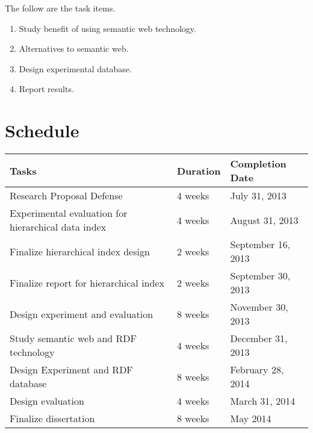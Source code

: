 The follow are the task items.

\begin{enumerate}
\item Study benefit of using semantic web technology.
\item Alternatives to semantic web.
\item Design experimental database.
\item Report results.
\end{enumerate}

\section{Schedule}

\begin{table}[ht]
\centering
\begin{tabular}{|l|l|l|}
\hline
{\bf Tasks} & {\bf Duration} & {\bf Completion Date} \\ \hline\hline
Research Proposal Defense & 4 weeks & July 31, 2013 \\
Experimental evaluation for hierarchical data index & 4 weeks & August 31, 2013 \\
Finalize hierarchical index design & 2 weeks & September 16, 2013\\
Finalize report for hierarchical index & 2 weeks & September 30, 2013\\
Design experiment and evaluation & 8 weeks & November 30, 2013 \\
Study semantic web and RDF technology & 4 weeks & December 31, 2013\\
Design Experiment and RDF database & 8 weeks & February 28, 2014\\
Design evaluation & 4 weeks & March 31, 2014\\
Finalize dissertation & 8 weeks & May 2014\\
\hline
\end{tabular}
\end{table}